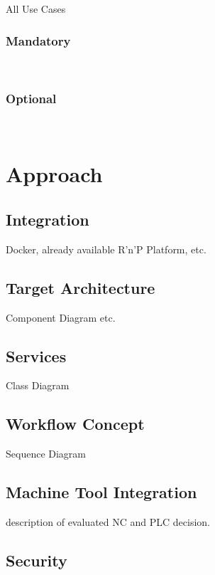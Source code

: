 \documentclass[
a4paper,
twoside,
bibliography=totoc,
headsepline,
cleardoublepage=empty,
parskip=half,
draft=false
]{scrbook}
\begin{document}
				All Use Cases
				
				\subsubsection{Mandatory} \label{subsubsec:mandatory}
				
				\subsubsection{Optional} \label{subsubsec:optional}	
			
		\section{Approach} \label{sec:approach}
		
			\subsection{Integration} \label{subsec:integration}
			
				Docker, already available R'n'P Platform, etc.
				
			\subsection{Target Architecture} \label{subsec:target_architecture}
			
				Component Diagram etc.
			
			\subsection{Services} \label{subsec:services}
			
				Class Diagram
				
			\subsection{Workflow Concept} \label{subsec:workflow_concept}
			
				Sequence Diagram
				
			\subsection{Machine Tool Integration} \label{subsec:machine_tool_intergation}
			
				description of evaluated NC and PLC decision.
				
			\subsection{Security} \label{subsec:security}
			
\end{document}
